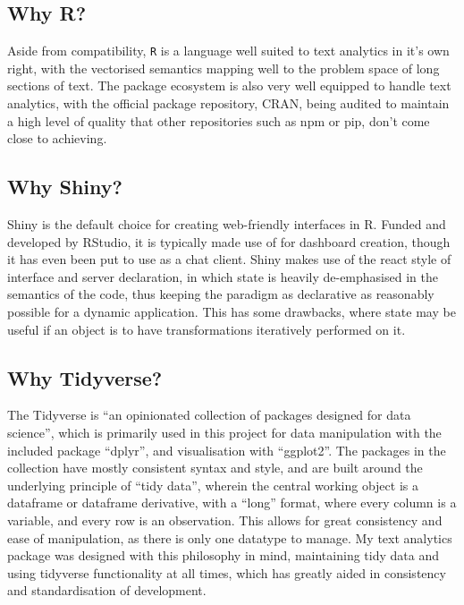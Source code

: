 \documentclass[11pt, a4paper, titlepage]{report}
\begin{document}
\subsection{Why R?}

Aside from compatibility, \texttt{R} is a language well suited to text
analytics in it's own right, with the vectorised semantics mapping
well to the problem space of long sections of text. The package
ecosystem is also very well equipped to handle text analytics, with
the official package repository, CRAN, being audited to maintain a
high level of quality that other repositories such as npm or pip,
don't come close to achieving.

\subsection{Why Shiny?}

Shiny is the default choice for creating web-friendly interfaces in R.
Funded and developed by RStudio, it is typically made use of for
dashboard creation, though it has even been put to use as a chat
client. Shiny makes use of the react style of interface and server
declaration, in which state is heavily de-emphasised in the semantics
of the code, thus keeping the paradigm as declarative as reasonably
possible for a dynamic application. This has some drawbacks, where
state may be useful if an object is to have transformations
iteratively performed on it.

\subsection{Why Tidyverse?}\label{sec:why-tidyverse}

The Tidyverse is ``an opinionated collection of packages designed for
data science'', which is primarily used in this project for data
manipulation with the included package
``dplyr''\autocite{wickham19dpl}, and visualisation with ``ggplot2''.
The packages in the collection have mostly consistent syntax and
style, and are built around the underlying principle of ``tidy data'',
wherein the central working object is a dataframe or dataframe
derivative, with a ``long'' format, where every column is a variable,
and every row is an observation\autocite{wickham2014tidy}. This allows
for great consistency and ease of manipulation, as there is only one
datatype to manage. My text analytics package was designed with this
philosophy in mind, maintaining tidy data and using tidyverse
functionality at all times, which has greatly aided in consistency and
standardisation of development.
\end{document}
